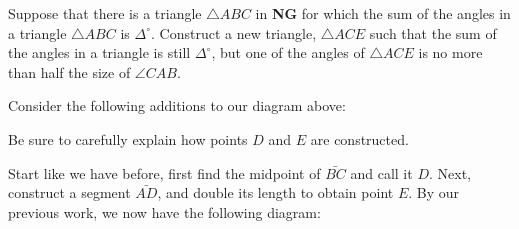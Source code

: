 \documentclass{ximera}
\begin{document}
\begin{problem}\label{22} 
Suppose that there is a triangle $\triangle ABC$ in \textbf{NG} for
which the sum of the angles in a triangle $\triangle ABC$ is
$\Delta^\circ$. Construct a new triangle, $\triangle ACE$ such that
the sum of the angles in a triangle is still $\Delta^\circ$, but one
of the angles of $\triangle ACE$ is no more than half the size of
$\angle CAB$.
\begin{image}
\end{image}



\begin{hint} Consider the following additions to our diagram above:
\begin{image}
\end{image}
Be sure to carefully explain how points $D$ and $E$ are constructed.
\end{hint}
\begin{freeResponse}
Start like we have before, first find the midpoint of $\bar{BC}$ and
call it $D$. Next, construct a segment $\bar{AD}$, and double its
length to obtain point $E$. By our previous work, we now have the
following diagram:
\begin{image}
\end{image}
\end{freeResponse}
\end{problem}
\end{document}
